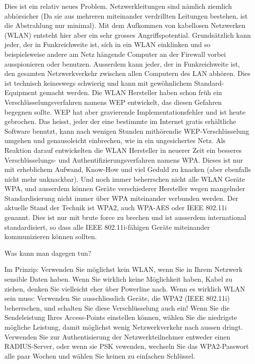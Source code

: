 Dies ist ein relativ neues Problem. Netzwerkleitungen sind nämlich ziemlich abhörsicher (Da sie aus mehreren miteinander verdrillten
Leitungen bestehen, ist die Abstrahlung nur minimal). Mit dem Aufkommen von kabellosen Netzwerken (WLAN) entsteht hier aber ein sehr
grosses Angriffspotential. Grundsätzlich kann jeder, der in Funkreichweite ist, sich in ein WLAN einklinken und so beispielsweise andere
am Netz hängende Computer an der Firewall vorbei ausspionieren oder benutzen. Ausserdem kann jeder, der in Funkreichweite ist, den gesamten
Netzwerkverkehr zwischen allen Computern des LAN abhören. Dies ist technisch keineswegs schwierig und kann mit gewöhnlichem Standard-Equipment
gemacht werden. Die WLAN Hersteller haben schon früh ein Verschlüsselungsverfahren namens WEP entwickelt, das diesen Gefahren begegnen sollte.
WEP hat aber gravierende Implementationsfehler und ist heute gebrochen. Das heisst, jeder der eine bestimmte im Internet gratis erhältliche
Software benutzt, kann nach wenigen Stunden \glqq mithören\grqq die
WEP-Verschlüsselung umgehen und genausoleicht einbrechen, wie in ein ungesichertes Netz. Als Reaktion darauf entwickelten die
WLAN Hersteller in neuerer Zeit ein besseres Verschlüsselungs- und Authentifizierungsverfahren namens WPA. Dieses ist nur mit erheblichem
Aufwand, Know-How und viel Geduld zu knacken (aber ebenfalls nicht mehr unknackbar).
Und noch immer beherrschen nicht alle WLAN Geräte WPA, und ausserdem können Geräte verschiederer Hersteller wegen mangelnder
Standardisierung nicht immer über WPA miteinander verbunden werden. Der aktuelle Stand der Technik ist WPA2, auch WPA-AES oder
IEEE 802.11i genannt. Dies ist nur mit brute force zu brechen und ist ausserdem international standardisiert, so dass alle IEEE
802.11i-fähigen Geräte miteinander kommunizieren können sollten.

Was kann man dagegen tun?

Im Prinzip: Verwenden Sie möglichst kein WLAN, wenn Sie in Ihrem Netzwerk sensible Daten haben. Wenn Sie wirklich keine Möglichkeit haben,
Kabel zu ziehen, denken Sie vielleicht eher über Powerline nach. Wenn es wirklich WLAN sein muss: Verwenden Sie ausschliesslich Geräte, die
WPA2 (IEEE 802.11i) beherrschen, und schalten Sie diese Verschlüsselung auch ein! Wenn Sie die Sendeleistung Ihres Access-Points einstellen
können, wählen Sie die niedrigste mögliche Leistung, damit möglichst wenig Netzwerkverkehr nach aussen dringt. Verwenden Sie zur Authentisierung
der Netzwerkteilnehmer entweder einen RADIUS-Server, oder wenn sie PSK vewenden, wechseln Sie das WPA2-Passwort alle paar Wochen und
wählen Sie keinen zu einfachen Schlüssel.

